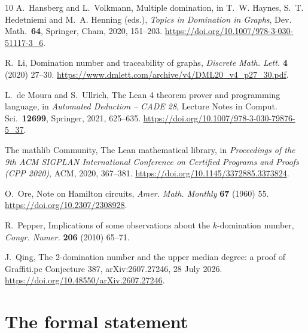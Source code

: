 \documentclass[11pt,a4paper]{article}
\theoremstyle{remark}
\begin{document}
\begin{thebibliography}{10}
 A.~Hansberg and L.~Volkmann, Multiple domination, in T.~W. Haynes, S.~T. Hedetniemi
and M.~A. Henning (eds.), \emph{Topics in Domination in Graphs}, Dev. Math.~\textbf{64}, Springer,
Cham, 2020, 151--203. \url{https://doi.org/10.1007/978-3-030-51117-3_6}.

 R.~Li, Domination number and traceability of graphs, \emph{Discrete Math. Lett.}
\textbf{4} (2020) 27--30. \url{https://www.dmlett.com/archive/v4/DML20_v4_p27_30.pdf}.

 L.~de Moura and S.~Ullrich, The Lean 4 theorem prover and programming language,
in \emph{Automated Deduction -- CADE 28}, Lecture Notes in Comput. Sci.~\textbf{12699},
Springer, 2021, 625--635. \url{https://doi.org/10.1007/978-3-030-79876-5_37}.

 The mathlib Community, The Lean mathematical library, in \emph{Proceedings of
the 9th ACM SIGPLAN International Conference on Certified Programs and Proofs (CPP 2020)}, ACM,
2020, 367--381. \url{https://doi.org/10.1145/3372885.3373824}.

 O.~Ore, Note on Hamilton circuits, \emph{Amer. Math. Monthly} \textbf{67} (1960)
55. \url{https://doi.org/10.2307/2308928}.

 R.~Pepper, Implications of some observations about the $k$-domination number,
\emph{Congr. Numer.} \textbf{206} (2010) 65--71.

 J.~Qing, The 2-domination number and the upper median degree: a proof of
Graffiti.pc Conjecture 387, arXiv:2607.27246, 28 July 2026.
\url{https://doi.org/10.48550/arXiv.2607.27246}.
\end{thebibliography}

\appendix
\section{The formal statement}\label{app:lean}
\end{document}

